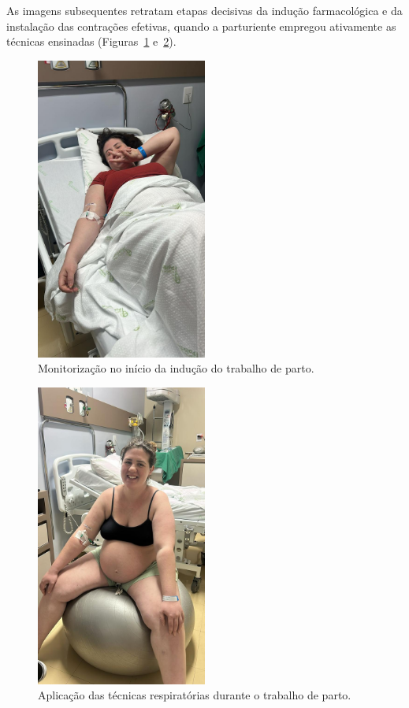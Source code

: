\documentclass[openright]{tex/estilos/normas-utf-tex}
\begin{document}
As imagens subsequentes retratam etapas decisivas da indução farmacológica e da instalação das contrações efetivas, quando a parturiente empregou ativamente as técnicas ensinadas (Figuras~\ref{fig:inicio-inducao-trabalho} e~\ref{fig:trabalho-parto}).

\begin{figure}[H]
    \centering
    \includegraphics[width=0.5\textwidth]{assets/imagens/IMG_0758.JPG}
    \caption{Monitorização no início da indução do trabalho de parto.}
    \label{fig:inicio-inducao-trabalho}
\end{figure}

\begin{figure}[H]
    \centering
    \includegraphics[width=0.5\textwidth]{assets/imagens/IMG_0759.JPG}
    \caption{Aplicação das técnicas respiratórias durante o trabalho de parto.}
    \label{fig:trabalho-parto}
\end{figure}
\end{document}
